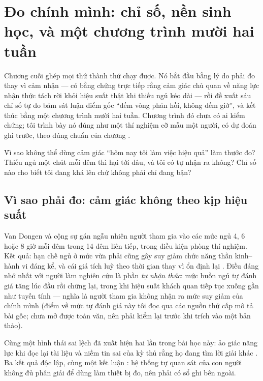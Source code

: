 \documentclass[../hieu-suat.tex]{subfiles}
\begin{document}
\chapter{Đo chính mình: chỉ số, nền sinh học, và một chương trình mười hai tuần}

\begin{tomtat}
Chương cuối ghép mọi thứ thành thứ chạy được. Nó bắt đầu bằng lý do phải đo thay vì cảm nhận --- có bằng chứng trực tiếp rằng cảm giác chủ quan về năng lực nhận thức tách rời khỏi hiệu suất thật khi thiếu ngủ kéo dài --- rồi đề xuất sáu chỉ số tự đo bám sát luận điểm gốc ``đếm vòng phản hồi, không đếm giờ'', và kết thúc bằng một chương trình mười hai tuần. Chương trình đó chưa có ai kiểm chứng; tôi trình bày nó đúng như một thí nghiệm cỡ mẫu một người, có dự đoán ghi trước, theo đúng chuẩn của chương .
\end{tomtat}

\begin{khoigoi}
\h{Vì sao không thể dùng cảm giác ``hôm nay tôi làm việc hiệu quả'' làm thước đo?}
\h{Thiếu ngủ một chút mỗi đêm thì hại tới đâu, và tôi có tự nhận ra không?}
\h{Chỉ số nào cho biết tôi đang khá lên chứ không phải chỉ đang bận?}
\end{khoigoi}

\section{Vì sao phải đo: cảm giác không theo kịp hiệu suất}

Van Dongen và cộng sự \cite{vandongen2003} gán ngẫu nhiên người tham gia vào các mức ngủ 4, 6 hoặc 8 giờ mỗi đêm trong 14 đêm liên tiếp, trong điều kiện phòng thí nghiệm. Kết quả: hạn chế ngủ ở mức vừa phải cũng gây suy giảm chức năng thần kinh--hành vi đáng kể, và cái giá tích luỹ theo thời gian thay vì ổn định lại \nD{}. Điều đáng nhớ nhất với người làm nghiên cứu là phần \emph{tự nhận thức}: mức buồn ngủ tự đánh giá tăng lúc đầu rồi chững lại, trong khi hiệu suất khách quan tiếp tục xuống gần như tuyến tính --- nghĩa là người tham gia không nhận ra mức suy giảm của chính mình \nD{} (điểm về mức tự đánh giá này tôi đọc qua các nguồn thứ cấp mô tả bài gốc; chưa mở được toàn văn, nên phải kiểm lại trước khi trích vào một bản thảo).

Cùng một hình thái sai lệch đã xuất hiện hai lần trong bài học này: ảo giác năng lực khi đọc lại tài liệu \cite{karpicke2009} và niềm tin sai của kỳ thủ rằng họ đang tìm lời giải khác \cite{bilalic2008}. Ba kết quả độc lập, cùng một kết luận \nM{}: hệ thống tự quan sát của con người không đủ phân giải để dùng làm thiết bị đo, nên phải có sổ ghi bên ngoài.
\end{document}
